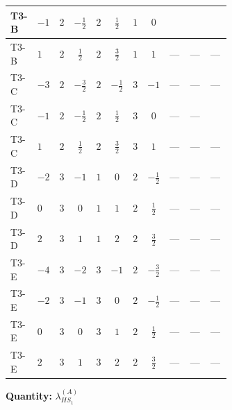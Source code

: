 \documentclass[8pt]{article}
\begin{document}
\begin{landscape}
\begin{longtable}{@{}llcccccc >{\raggedright\arraybackslash}p{0.21\linewidth} >{\raggedright\arraybackslash}p{0.21\linewidth} >{\raggedright\arraybackslash}p{0.21\linewidth}@{}}
T3-B & $-1$ & $2$ & $-\frac{1}{2}$ & $2$ & $\frac{1}{2}$ & $1$ & $0$ & \scriptsize\adjustbox{max width=\linewidth}{$\begin{gathered} +{\lambda_{H H^\dagger S_1^\dagger S_2^\dagger}^{\rm Cross}} \left(-\frac{2}{3} \operatorname{Tr}\!\left({y_1}\,\left({y_2}\right)^{\dagger}\right)-\frac{4}{3} (2 \left({\lambda_{H H^\dagger S_1^\dagger S_2^\dagger}^{\rm Cross}}\right)^{*}+\left({\lambda_{11}}\right)^{*})\right)\end{gathered}$} & \scriptsize\adjustbox{max width=\linewidth}{$\begin{gathered} -\frac{2}{3} \left({\lambda_{H H^\dagger S_1^\dagger S_2^\dagger}^{\rm Cross}}\right)^{*} \operatorname{Tr}\!\left({y_2}\,\left({y_1}\right)^{\dagger}\right)\end{gathered}$} & \scriptsize\adjustbox{max width=\linewidth}{$\begin{gathered} +\frac{64}{3} {\lambda_{7}} \left({\lambda_{7}}\right)^{*}\end{gathered}$} \\
\midrule
T3-B & $1$ & $2$ & $\frac{1}{2}$ & $2$ & $\frac{3}{2}$ & $1$ & $1$ & --- & --- & --- \\
\midrule
T3-C & $-3$ & $2$ & $-\frac{3}{2}$ & $2$ & $-\frac{1}{2}$ & $3$ & $-1$ & --- & --- & --- \\
\midrule
T3-C & $-1$ & $2$ & $-\frac{1}{2}$ & $2$ & $\frac{1}{2}$ & $3$ & $0$ & --- & --- & \scriptsize\adjustbox{max width=\linewidth}{$\begin{gathered} +\frac{64}{3} {\lambda_{7}} \left({\lambda_{7}}\right)^{*}\end{gathered}$} \\
\midrule
T3-C & $1$ & $2$ & $\frac{1}{2}$ & $2$ & $\frac{3}{2}$ & $3$ & $1$ & --- & --- & --- \\
\midrule
T3-D & $-2$ & $3$ & $-1$ & $1$ & $0$ & $2$ & $-\frac{1}{2}$ & --- & --- & --- \\
\midrule
T3-D & $0$ & $3$ & $0$ & $1$ & $1$ & $2$ & $\frac{1}{2}$ & --- & --- & --- \\
\midrule
T3-D & $2$ & $3$ & $1$ & $1$ & $2$ & $2$ & $\frac{3}{2}$ & --- & --- & --- \\
\midrule
T3-E & $-4$ & $3$ & $-2$ & $3$ & $-1$ & $2$ & $-\frac{3}{2}$ & --- & --- & --- \\
\midrule
T3-E & $-2$ & $3$ & $-1$ & $3$ & $0$ & $2$ & $-\frac{1}{2}$ & --- & --- & --- \\
\midrule
T3-E & $0$ & $3$ & $0$ & $3$ & $1$ & $2$ & $\frac{1}{2}$ & --- & --- & --- \\
\midrule
T3-E & $2$ & $3$ & $1$ & $3$ & $2$ & $2$ & $\frac{3}{2}$ & --- & --- & --- \\
\midrule
\bottomrule
\end{longtable}
\clearpage
\noindent\textbf{Quantity: }$\lambda_{HS_1}^{(A)}$\par\smallskip

\end{landscape}
\end{document}
